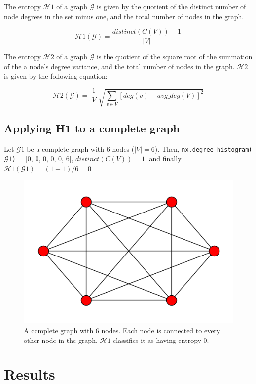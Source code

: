 \documentclass[journal]{IEEEtran}
\begin{document}
The entropy $\mathcal{H}1$ of a graph $\mathcal{G}$ is given by the quotient of the distinct number of node degrees in the set minus one, and the total number of nodes in the graph.

\begin{equation}
   \mathcal{H}1(\mathcal{G}) = \frac{distinct(C(V)) - 1}{|V|}
\end{equation}

\bigskip

The entropy $\mathcal{H}2$ of a graph $\mathcal{G}$ is the quotient of the square root of the summation of the a node's degree variance, and the total number of nodes in the graph. $\mathcal{H}2$ is given by the following equation:

\begin{equation}
   \mathcal{H}2(\mathcal{G}) = \frac{1}{|V|} \sqrt{\sum_{v \in V} [deg(v) - avg\_deg(V)] ^ 2}
\end{equation}

\subsection{Applying H1 to a complete graph}

Let $\mathcal{G}1$ be a complete graph with 6 nodes ($|V| = 6$). Then, \texttt{nx.degree\_histogram($\mathcal{G}1$)} = [0, 0, 0, 0, 0, 6], $ distinct(C(V)) = 1$, and finally $\mathcal{H}1(\mathcal{G}1) = (1 - 1) / 6 = 0$

\begin{figure}[ht]
    \centering
    \includegraphics[width=0.6\linewidth]{res/complete-graph.png}
    \caption{A complete graph with 6 nodes. Each node is connected to every other node in the graph. $\mathcal{H}1$ classifies it as having entropy 0.
    }
\end{figure}


\section{Results}
\end{document}
